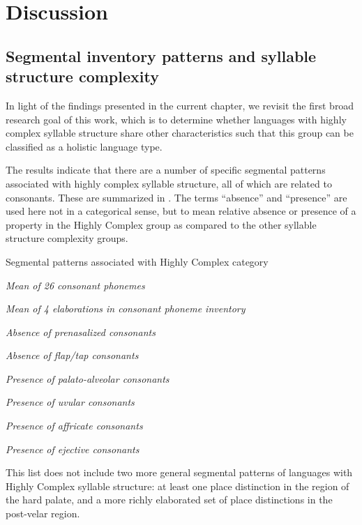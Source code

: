 \section{Discussion}\label{sec:4.5}
\subsection{Segmental inventory patterns and syllable structure complexity}\label{sec:4.5.1}

  In light of the findings presented in the current chapter, we revisit the first broad research goal of this work, which is to determine whether languages with highly complex syllable structure share other characteristics such that this group can be classified as a holistic language type.

  The results indicate that there are a number of specific segmental patterns associated with highly complex syllable structure, all of which are related to consonants. These are summarized in . The terms ``absence'' and ``presence'' are used here not in a categorical sense, but to mean relative absence or presence of a property in the Highly Complex group as compared to the other syllable structure complexity groups.

\ea\label{ex:4.34}
  Segmental patterns associated with Highly Complex category

\textit{Mean of 26 consonant phonemes}

\textit{Mean of 4 elaborations in consonant phoneme inventory}

\textit{Absence of prenasalized consonants}

\textit{Absence of flap/tap consonants}

\textit{Presence of palato-alveolar consonants}

\textit{Presence of uvular consonants}

\textit{Presence of affricate consonants} 

\textit{Presence of ejective consonants}
\z

  This list does not include two more general segmental patterns of languages with Highly Complex syllable structure: at least one place distinction in the region of the hard palate, and a more richly elaborated set of place distinctions in the post-velar region.


